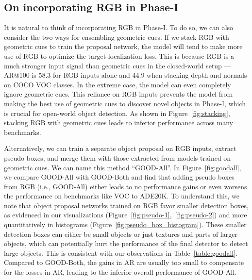 \documentclass{article} \usepackage{iclr2023_conference,times}
\begin{document}
\subsection{On incorporating RGB in Phase-I}
It is  natural to think of incorporating RGB in Phase-I. 
To do so, we can also consider the two ways for ensembling geometric cues.
If we stack RGB with geometric cues to train the proposal network, the model will tend to make more use of RGB to optimize the target localization loss. This is because RGB is a much stronger input signal than geometric cues in the closed-world setup — AR@100 is 58.3 for RGB inputs alone and 44.9 when stacking depth and normals on COCO VOC classes. In the extreme case, the model can even completely ignore geometric cues. This reliance on RGB inputs prevents the model from making the best use of geometric cues to discover novel objects in Phase-I, which is crucial for open-world object detection.
As shown in Figure~\ref{fig:stacking}, stacking RGB with geometric cues leads to inferior performance across many benchmarks.

Alternatively, we can train a separate object proposal on RGB inputs, extract pseudo boxes, and merge them with those extracted from models trained on geometric cues. We can name this method ``GOOD-All''. In Figure~\ref{fig:goodall}, we compare GOOD-All with GOOD-Both and find that adding pseudo boxes from RGB (i.e., GOOD-All) either leads to no performance gains or even worsens the performance on benchmarks like VOC to ADE20K. To understand this, we note that object proposal networks trained on RGB favor smaller detection boxes, as evidenced in our visualizations (Figure~\ref{fig:pseudo-1},~\ref{fig:pseudo-2}) and more quantitatively in histograms (Figure~\ref{fig:pseudo_box_histogram}). These smaller detection boxes can either be small objects or just textures and parts of larger objects, which can potentially hurt the performance of the final detector to detect large objects. This is consistent with our observations in Table~\ref{table:goodall}. Compared to GOOD-Both, the gains in AR are usually too small to compensate for the losses in AR, leading to the inferior overall performance of GOOD-All.
\end{document}
